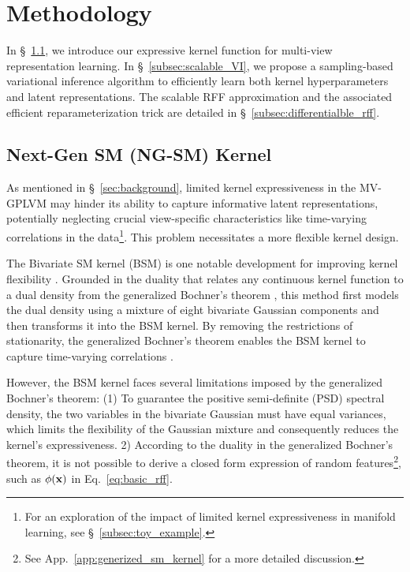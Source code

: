 \vspace{-0.08in}
\section{Methodology}
\label{sec:method}
\vspace{-0.08in}
In \S~\ref{subsec:NG_kernel}, we introduce our expressive kernel function for multi-view representation learning. In \S~\ref{subsec:scalable_VI}, we propose a sampling-based variational inference algorithm to efficiently learn both kernel hyperparameters and latent representations. The scalable RFF approximation and the associated efficient reparameterization trick are detailed in \S~\ref{subsec:differentialble_rff}.

\vspace{-0.08in}
\subsection{Next-Gen SM (NG-SM) Kernel}
\label{subsec:NG_kernel}
\vspace{-0.08in}
As mentioned in \S~\ref{sec:background}, limited kernel expressiveness in the MV-GPLVM may hinder its ability to capture informative latent representations, potentially neglecting crucial view-specific characteristics like time-varying correlations in the data\footnote{For an exploration of the impact of limited kernel expressiveness in manifold learning, see \S~\ref{subsec:toy_example}.}. This problem necessitates a more flexible kernel design.

The Bivariate SM kernel (BSM) is one notable development for improving kernel flexibility \citep{chen2024compressing, remes2017non, chen2021gaussian}.
Grounded in the duality that relates any continuous kernel function to a dual density from the generalized Bochner’s theorem \citep{yaglom1987correlation}, this method first models the dual density using a mixture of eight bivariate Gaussian components and then transforms it into the BSM kernel. By removing the restrictions of stationarity, the generalized Bochner’s theorem enables the BSM kernel to capture time-varying correlations \citep{remes2017non}.

However, the BSM kernel faces several limitations imposed by the generalized Bochner’s theorem: (1) To guarantee the positive semi-definite (PSD) spectral density, the two variables in the bivariate Gaussian must have equal variances, which limits the flexibility of the Gaussian mixture and consequently reduces the kernel’s expressiveness. 2) According to the duality in the generalized Bochner’s theorem, it is not possible to derive a closed form expression of random features\footnote{See App.~\ref{app:generized_sm_kernel} for a more detailed discussion.}, such as $\phi({\mathbf x})$ in Eq.~\eqref{eq:basic_rff}.

